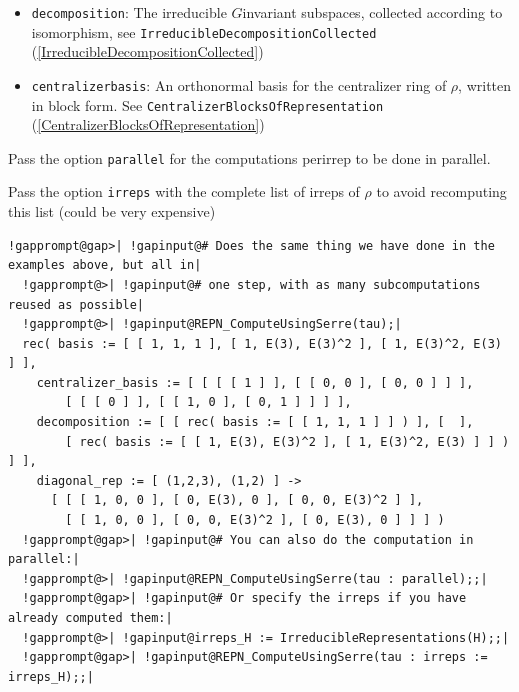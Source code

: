 \documentclass[a4paper,11pt]{report}
\begin{document}
{{{ 
\begin{itemize}
\item  \texttt{decomposition}: The irreducible $G$\texttt{}invariant subspaces, collected according to isomorphism,
see \texttt{IrreducibleDecompositionCollected} (\ref{IrreducibleDecompositionCollected}) 
\end{itemize}
 

 
\begin{itemize}
\item  \texttt{centralizer{\textunderscore}basis}: An orthonormal basis for the centralizer ring of $\rho$, written in block form. See \texttt{CentralizerBlocksOfRepresentation} (\ref{CentralizerBlocksOfRepresentation}) 
\end{itemize}
 

 Pass the option \texttt{parallel} for the computations per\texttt{}irrep to be done in parallel. 

 Pass the option \texttt{irreps} with the complete list of irreps of $\rho$ to avoid recomputing this list (could be very expensive) 

 

 
\begin{Verbatim}[commandchars=!@|,fontsize=\small,frame=single,label=Example]
  !gapprompt@gap>| !gapinput@# Does the same thing we have done in the examples above, but all in|
  !gapprompt@>| !gapinput@# one step, with as many subcomputations reused as possible|
  !gapprompt@>| !gapinput@REPN_ComputeUsingSerre(tau);|
  rec( basis := [ [ 1, 1, 1 ], [ 1, E(3), E(3)^2 ], [ 1, E(3)^2, E(3) ] ],
    centralizer_basis := [ [ [ [ 1 ] ], [ [ 0, 0 ], [ 0, 0 ] ] ],
        [ [ [ 0 ] ], [ [ 1, 0 ], [ 0, 1 ] ] ] ],
    decomposition := [ [ rec( basis := [ [ 1, 1, 1 ] ] ) ], [  ],
        [ rec( basis := [ [ 1, E(3), E(3)^2 ], [ 1, E(3)^2, E(3) ] ] ) ] ],
    diagonal_rep := [ (1,2,3), (1,2) ] ->
      [ [ [ 1, 0, 0 ], [ 0, E(3), 0 ], [ 0, 0, E(3)^2 ] ],
        [ [ 1, 0, 0 ], [ 0, 0, E(3)^2 ], [ 0, E(3), 0 ] ] ] )
  !gapprompt@gap>| !gapinput@# You can also do the computation in parallel:|
  !gapprompt@>| !gapinput@REPN_ComputeUsingSerre(tau : parallel);;|
  !gapprompt@gap>| !gapinput@# Or specify the irreps if you have already computed them:|
  !gapprompt@>| !gapinput@irreps_H := IrreducibleRepresentations(H);;|
  !gapprompt@gap>| !gapinput@REPN_ComputeUsingSerre(tau : irreps := irreps_H);;|
\end{Verbatim}
 

 }

 }

 }
\end{document}
